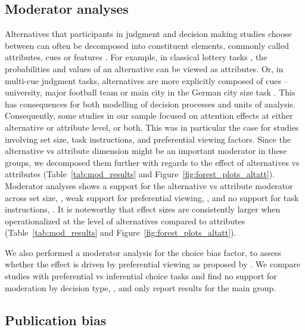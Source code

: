 \documentclass[english,natbib,man,floatsintext]{apa6}
\begin{document}
\subsection{Moderator analyses}

Alternatives that participants in judgment and decision making studies choose between can often be decomposed into constituent elements, commonly called attributes, cues or features \citep{payne1988,tversky1972elimination,stojic2020s,gigerenzer1996reasoning,schulz2018putting,hogarth2007heuristic}. For example, in classical lottery tasks \citep{tversky1979}, the probabilities and values of an alternative can be viewed as attributes. Or, in multi-cue judgment tasks, alternatives are more explicitly composed of cues -- university, major football team or main city in the German city size task \citep{gigerenzer1996reasoning}. This has consequences for both modelling of decision processes and units of analysis. Consequently, some studies in our sample focused on attention effects at either alternative or attribute level, or both. This was in particular the case for studies involving set size, task instructions, and preferential viewing factors. Since the alternative vs attribute dimension might be an important moderator in these groups, we decomposed them further with regards to the effect of alternatives vs attributes (Table~\ref{tab:mod_results} and Figure~\ref{fig:forest_plots_altatt}). Moderator analyses shows a support for the alternative vs attribute moderator across set size, , weak support for preferential viewing, , and no support for task instructions, . It is noteworthy that effect sizes are consistently larger when operationalized at the level of alternatives compared to attributes (Table~\ref{tab:mod_results} and Figure~\ref{fig:forest_plots_altatt}). 

We also performed a moderator analysis for the choice bias factor, to assess whether the effect is driven by preferential viewing as proposed by \cite{shimojo2003a}. We compare studies with preferential vs inferential choice tasks and find no support for moderation by decision type, , and only report results for the main group. 

\subsection{Publication bias}
\end{document}
